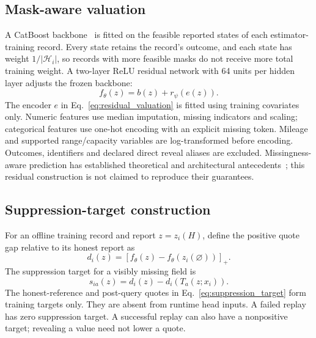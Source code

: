 \documentclass[10pt,journal]{IEEEtran}
\begin{document}
\subsection{Mask-aware valuation}
A CatBoost backbone~\cite{prokhorenkova2018catboost} is fitted on the feasible
reported states of each estimator-training record. Every state retains the
record's outcome, and each state has weight $1/|\mathcal H_i|$, so records with
more feasible masks do not receive more total training weight. A two-layer
ReLU residual network with 64 units per hidden layer adjusts the frozen
backbone:
\begin{equation}
f_\theta(z)=b(z)+r_\psi(e(z)).
\label{eq:residual_valuation}
\end{equation}
The encoder $e$ in Eq.~\eqref{eq:residual_valuation} is fitted using training
covariates only. Numeric features use
median imputation, missing indicators and scaling; categorical features use
one-hot encoding with an explicit missing token. Mileage and supported
range/capacity variables are log-transformed before encoding. Outcomes,
identifiers and declared direct reveal aliases are excluded. Missingness-aware
prediction has established theoretical and architectural
antecedents~\cite{lemorvan2020neumiss,lemorvan2021imputation}; this residual
construction is not claimed to reproduce their guarantees.

\subsection{Suppression-target construction}
For an offline training record and report $z=z_i(H)$, define the positive
quote gap relative to its honest report as
\begin{equation*}
d_i(z)=[f_\theta(z)-f_\theta(z_i(\varnothing))]_+.
\end{equation*}
The suppression target for a visibly missing field is
\begin{equation}
s_{ia}(z)=d_i(z)-d_i(T_a(z;x_i)).
\label{eq:suppression_target}
\end{equation}
The honest-reference and post-query quotes in
Eq.~\eqref{eq:suppression_target} form training targets only.
They are absent from runtime head inputs. A failed replay has zero
suppression target. A successful replay can also have a nonpositive target;
revealing a value need not lower a quote.
\end{document}
